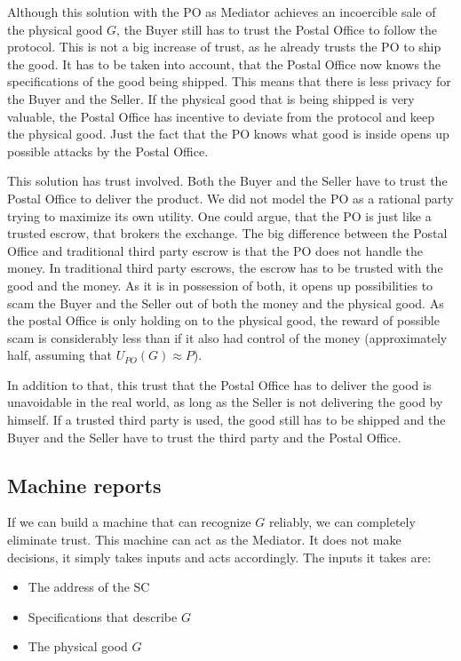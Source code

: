 \documentclass{cacthesis}
\begin{document}
Although this solution with the PO as Mediator achieves an incoercible sale of the physical good $G$, the Buyer still has to trust the Postal Office to follow the protocol. This is not a big increase of trust, as he already trusts the PO to ship the good. 
It has to be taken into account, that the Postal Office now knows the specifications of the good being shipped. This means that there is less privacy for the Buyer and the Seller. If the physical good that is being shipped is very valuable, the Postal Office has incentive to deviate from the protocol and keep the physical good. Just the fact that the PO knows what good is inside opens up possible attacks by the Postal Office.\newline

This solution has trust involved. Both the Buyer and the Seller have to trust the Postal Office to deliver the product. We did not model the PO as a rational party trying to maximize its own utility. One could argue, that the PO is just like a trusted escrow, that brokers the exchange.  The big difference between the Postal Office and traditional third party escrow is that the PO does not handle the money. 
In traditional third party escrows, the escrow has to be trusted with the good and the money. As it is in possession of both, it opens up possibilities to scam the Buyer and the Seller out of both the money and the physical good.
As the postal Office is only holding on to the physical good, the reward of possible scam is considerably less than if it also had control of the money (approximately half, assuming that $U_{PO}(G) \approx P$).\newline

In addition to that, this trust that the Postal Office has to deliver the good is unavoidable in the real world, as long as the Seller is not delivering the good by himself. If a trusted third party is used, the good still has to be shipped and the Buyer and the Seller have to trust the third party and the Postal Office. 

\subsection{Machine reports}
\label{sec:machine-reporst}
If we can build a machine that can recognize $G$ reliably, we can completely eliminate trust. This machine can act as the Mediator. It does not make decisions, it simply takes inputs and acts accordingly.\newline
The inputs it takes are:
\begin{itemize}
    \item The address of the SC
    \item Specifications that describe $G$
    \item The physical good $G$\newline
\end{itemize}
\end{document}
